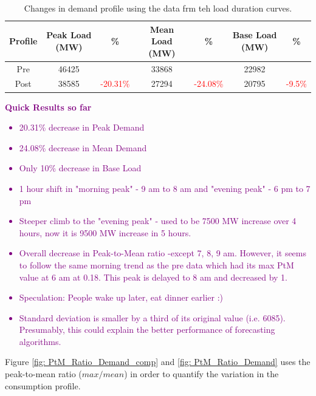 \documentclass[energies,article,submit,moreauthors,pdftex]{Definitions/mdpi}
\begin{document}
\begin{table}[H]
\caption{Changes in demand profile using the data frm teh load duration curves. }
\centering
\begin{tabular}{ccccccc}
\toprule
\textbf{Profile} & \textbf{Peak Load (MW)}	& \textbf{\%} & \textbf{ Mean Load (MW)}	& \textbf{\%}	& \textbf{ Base Load (MW)}	& \textbf{\%}\\
\midrule
Pre	& 46425 & & 33868 & & 22982 &  \\
Post & 38585 & \textcolor{red}{-20.31\%} & 27294 & \textcolor{red}{-24.08\%} & 20795 & \textcolor{red}{-9.5\%} \\

\bottomrule
\end{tabular}
\end{table}

\textcolor{purple}{
\textbf{Quick Results so far}
\begin{itemize}
    \item 20.31\% decrease in Peak Demand
    \item 24.08\% decrease in Mean Demand
    \item Only 10\% decrease in Base Load
    \item 1 hour shift in "morning peak" - 9 am to 8 am and "evening peak" - 6 pm to 7 pm
    \item Steeper climb to the "evening peak" - used to be 7500 MW increase over 4 hours, now it is 9500 MW increase in 5 hours.
    \item Overall decrease in Peak-to-Mean ratio -except  7, 8, 9 am. However, it seems to follow the same morning trend as the pre data which had its max PtM value at 6 am at 0.18. This peak is delayed to 8 am and decreased by 1. 
    \item Speculation: People wake up later, eat dinner earlier :)
    \item Standard deviation is smaller by a third of its original value (i.e. 6085). Presumably, this could explain the better performance of forecasting algorithms.
\end{itemize}
}


Figure \ref{fig: PtM_Ratio_Demand_comp} and \ref{fig: PtM_Ratio_Demand} uses the peak-to-mean ratio ($max/mean$) in order to quantify the variation in the consumption profile. 
\end{document}
